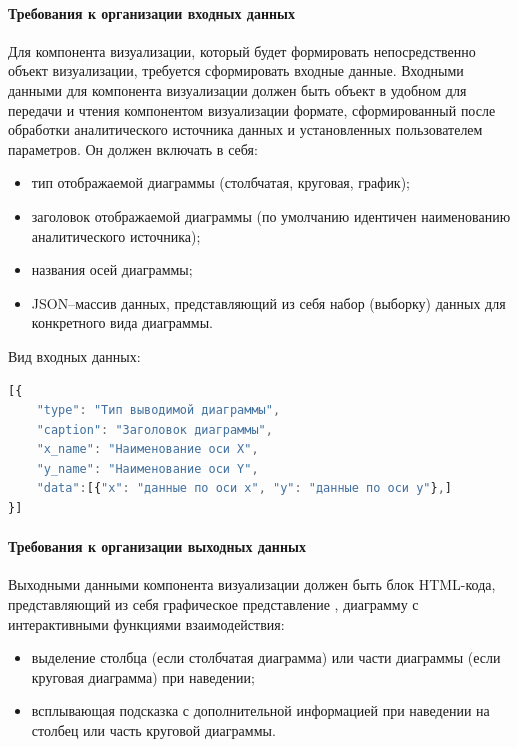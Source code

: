 \documentclass[a4paper]{extarticle}
\numberwithin{equation}{section}
\begin{document}
\paragraph{Требования к организации входных данных}
Для компонента визуализации, который будет формировать непосредственно объект визуализации, требуется сформировать входные данные. Входными данными для компонента визуализации должен быть объект в удобном для передачи и чтения компонентом визуализации формате, сформированный после обработки аналитического источника данных и установленных пользователем параметров. Он должен включать в себя:\par
\begin{itemize}
  \item тип отображаемой диаграммы (столбчатая, круговая, график);
  \item заголовок отображаемой диаграммы (по умолчанию идентичен наименованию аналитического источника);
  \item названия осей диаграммы;
  \item JSON–массив данных, представляющий из себя набор (выборку) данных для конкретного вида диаграммы.
\end{itemize}\par
Вид входных данных:\par
\lstset{inputencoding=utf8, extendedchars=\true, commentstyle=\itshape}
\begin{lstlisting}[language=JavaScript]
[{
	"type": "Тип выводимой диаграммы",
	"caption": "Заголовок диаграммы",
	"x_name": "Наименование оси X",
	"y_name": "Наименование оси Y",
	"data":[{"x": "данные по оси x", "y": "данные по оси y"},]
}]
\end{lstlisting}

\paragraph{Требования к организации выходных данных}
Выходными данными компонента визуализации должен быть блок HTML-кода, представляющий из себя графическое представление , диаграмму с интерактивными функциями взаимодействия:
\begin{itemize}
  \item выделение столбца (если столбчатая диаграмма) или части диаграммы (если круговая диаграмма) при наведении;
  \item всплывающая подсказка с дополнительной информацией при наведении на столбец или часть круговой диаграммы.
\end{itemize}
\end{document}
